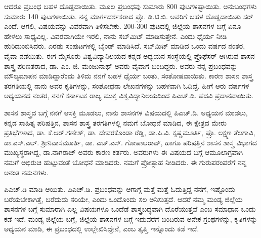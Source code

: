 ಆದರೂ ಪ್ರಬಂಧ ಬಹಳ ದೊಡ್ಡದಾಯಿತು. ಮೂಲ ಪ್ರಬಂಧವು ಸುಮಾರು 800 ಪುಟಗಳಷ್ಟಾಯಿತು. ಅನುಬಂಧಗಳು ಸುಮಾರು 140 ಪುಟಗಳಾಯಿತು. ನನ್ನ ಮಾರ್ಗದರ್ಶಕರಾದ ಪ್ರೊ. ಡಿ.ಟಿ.ಬಿ. ಅವರಿಗೆ ಬಹಳ ದೊಡ್ಡದಾಯಿತು ಸರ್​ ಎಂದೆ. ಆಗಲಿ, ವಿಷಯವನ್ನು ವಿವರವಾಗಿ ತಿಳಿಸಬೇಕು. 200-300 ಪುಟದಲ್ಲಿ ಜಿಲ್ಲೆಯ ಶಾಸನಗಳ ಬಗ್ಗೆ ಏನೂ ಹೇಳಲು ಸಾಧ್ಯವಿಲ್ಲ. ವಿವರವಾಗಿಯೇ ಇರಲಿ, ನಾನು ಸಬ್​ಮಿಟ್​ ಮಾಡಿಸುತ್ತೇನೆ. ಎಂದು ಧೈರ್ಯ ನೀಡಿ ಹುರಿದುಂಬಿಸಿದರು. ಎರಡು ಸಂಪುಟಗಳಲ್ಲಿ ಬೈಂಡ್​ ಮಾಡಿಸಿದೆ. ಸಬ್​ಮಿಟ್​ ಮಾಡಿದ ಒಂದು ವರ್ಷದ ನಂತರ, ವೈವಾ ನಡೆಯಿತು. ಈಗ ಮೈಸೂರು ವಿಶ್ವವಿದ್ಯಾನಿಲಯದ ಕನ್ನಡ ಅಧ್ಯಯನ ಸಂಸ್ಥೆಯಲ್ಲಿ ಪ್ರೊಫೆಸರ್​ ಆಗಿರುವ ಶಾಸನ ಶಾಸ್ತ್ರ ಪರಿಣತರಾದ, ಡಾ. ಎಂ. ಜಿ. ಮಂಜುನಾಥ್​ ಅವರು ವೈವಾಗೆ ಬಂದಿದ್ದರು. ಅವರು ನನ್ನ ಪ್ರಬಂಧವನ್ನು ಮೌಲ್ಯಮಾಪನ ಮಾಡಿದ್ದಾರೆಂದು ತಿಳಿದು ನನಗೆ ಬಹಳ ಧೈರ್ಯ ಬಂತು, ಸಂತೋಷವಾಯಿತು. ಕಾರಣ ಶಾಸನ ಶಾಸ್ತ್ರ ತರಗತಿಯಲ್ಲಿ ನಾನು ಅವರ ಕೃತಿಗಳನ್ನು, ಸಂಶೋಧನಾ ಲೇಖನಗಳನ್ನು ಬಹಳವಾಗಿ ಓದಿದ್ದೆ. ಹೀಗೆ ಆರು ವರ್ಷಗಳ ಅಧ್ಯಯನದ ನಂತರ, ನನಗೆ ಕರ್ನಾಟಕ ರಾಜ್ಯ ಮುಕ್ತ ವಿಶ್ವವಿದ್ಯಾನಿಲಯದಿಂದ ಪಿಎಚ್​.ಡಿ. ಪದವಿ ಪ್ರದಾನವಾಯಿತು. 

ಶಾಸನ ಶಾಸ್ತ್ರದ ಬಗ್ಗೆ ನನಗೆ ಆಸಕ್ತಿ ಮೂಡಲು, ನಾನು ಶಾಸನಗಳ ವಿಷಯದಲ್ಲಿ ಪಿಎಚ್​.ಡಿ. ಅಧ್ಯಯನ ಮಾಡಲು, ಕನ್ನಡ ಸಾಹಿತ್ಯ ಪರಿಷತ್ತಿನ, ಶಾಸನ ಶಾಸ್ತ್ರ ತರಗತಿಗಳಲ್ಲಿ ನಮಗೆ ಬೋಧನೆ ಮಾಡಿದ, ಈ ಕ್ಷೇತ್ರದ ಮೇರು ಪ್ರತಿಭೆಗಳಾದ, ಡಾ. ಕೆ.ಆರ್​.ಗಣೇಶ್​, ಡಾ. ದೇವರಕೊಂಡಾ ರೆಡ್ಡಿ, ಡಾ.ಪಿ.ವಿ. ಕೃಷ್ಣಮೂರ್ತಿ, ಪ್ರೊ. ಲಕ್ಷ್ಮಣ ತೆಲಗಾವಿ, ಡಾ.ಎಸ್​.ಎಲ್​. ಶ‍್ರೀನಿವಾಸಮೂರ್ತಿ, ಡಾ. ಎಚ್​.ಎಸ್​. ಗೋಪಾಲರಾವ್​, ಹಾಗೂ ಪರಿಷತ್ತಿನ ಶಾಸನ ಶಾಸ್ತ್ರ ವಿಭಾಗದ ಮುಖ್ಯಸ್ಥರಾಗಿದ್ದ, ಡಾ.ನಾಗರಾಜ್​ ಅವರು ಕಾರಣ ಕರ್ತರು. ಅವರುಗಳು ಈ ವಿಷಯದ ಬಗ್ಗೆ ಆಮೂಲಾಗ್ರವಾಗಿ ನಮಗೆ ಅಭಿರುಚಿ ಹುಟ್ಟುವಂತೆ ಬೋಧನೆ ಮಾಡಿದರು. ನಮಗೆ ಪ್ರೋತ್ಸಾಹ ನೀಡಿದರು. ಈ ಗುರುಪರಂಪರೆಗೆ ನನ್ನ ಅನಂತ ನಮನಗಳು. 

\newpage

ಪಿಎಚ್​.ಡಿ ಮಾಡಿ ಆಯಿತು. ಪಿಎಚ್​.ಡಿ. ಪ್ರಬಂಧವನ್ನು ಆಗಾಗ್ಗೆ ಮತ್ತೆ ಮತ್ತೆ ಓದುತ್ತಿದ್ದ ನನಗೆ, ಇಷ್ಟೊಂದು ಬರೆಯಬೇಕಾಗಿತ್ತೆ, ಬರೆದುದು ಸರಿಯೇ, ಎಂದು ಒಂದೊಂದು ಸಲ ಅನಿಸುತ್ತದೆ. ಆದರೆ ನಮ್ಮ ಮಂಡ್ಯ ಜಿಲ್ಲೆಯ ಶಾಸನಗಳ ಬಗ್ಗೆ ಸುಮಾರಾಗಿ ಎಲ್ಲ ವಿಷಯಗಳೂ ಒಂದೆಡೆ ಶಾಸ್ತ್ರಬದ್ಧವಾಗಿ ದೊರೆಯುತ್ತವೆ ಎಂಬ ಸಮಾಧಾನ ಒಂದು ಕಡೆ ಇದೆ. ಮಂಡ್ಯ ಜಿಲ್ಲೆಯ ಬಗ್ಗೆ, ಜಿಲ್ಲೆಯ ಶಾಸನಗಳ ಬಗ್ಗೆ ಇದುವರೆಗೆ ಬಂದಿರುವ ಅನೇಕ ಗ್ರಂಥಗಳನ್ನು, ಕೃತಿಗಳನ್ನು ಅಧ್ಯಯನ ಮಾಡಿ, ಈ ಪ್ರಬಂಧದಲ್ಲಿ ಉಲ್ಲೇಖಿಸಿದ್ದೇನೆ, ಎಂಬ ತೃಪ್ತಿ ಇನ್ನೊಂದು ಕಡೆ ಇದೆ. 

